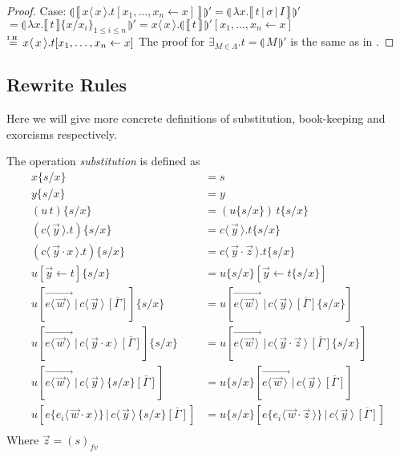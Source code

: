 \documentclass[a4paper,UKenglish,cleveref, autoref]{lipics-v2019}
\newcommand{\fv}[1]{(#1)_{fv}}
\newcommand{\abs}[2]{\lambda #1 . #2}
\newcommand{\app}[2]{#1 \, #2}
\newcommand{\fake}[3]{#1 \langle \, #2 \, \rangle . #3}
\newcommand{\share}[3]{#1 [#2 \leftarrow #3]}
\newcommand{\dist}[5]{#1 [ #2 \, \vert \, \fakedist{#4}{#5} \, #3 ]}
\newcommand{\fakedist}[2]{#1 \langle \, #2 \, \rangle}
\newcommand{\vecdist}[2]{\overrightarrow{\fakedist{#1}{#2} \,}}
\newcommand{\sub}[3]{#1 \{ #2 / #3 \}}
\newcommand{\compile}[1]{\llparenthesis \, #1 \, \rrparenthesis}
\newcommand{\readbackclose}[1]{\llbracket \, #1 \, \rrbracket }
\newcommand{\readbackwmap}[3]{\llbracket \, #1 \, \vert \, #2 \, \vert \, #3  \, \rrbracket }
\newcommand{\IH}{\stackrel{\hbox{\tiny I.H.}}{\hbox{=}}}
\begin{document}
\begin{proof}
\newline
\newline
\indent Case: $\compile{\readbackclose{\fake{x}{x}{t \share{}{x_{1}, \dots, x_{n}}{x}}}}' = \compile{\abs{x}{\readbackwmap{t}{\sigma}{I}}}'$
\newline
\indent $= \compile{\abs{x}{\readbackclose{t} \sub{}{x}{x_{i}}_{1 \leq i \leq n}}}' = \fake{x}{x}{ \compile{\readbackclose{t}}' \share{}{x_{1}, \dots, x_{n}}{x}}$
\newline
\indent $ \IH \fake{x}{x}{ t \share{}{x_{1}, \dots, x_{n}}{x}} $
\newline
\newline
The proof for $\exists_{ M \in \Lambda} . t = \compile{M}'$ is the same as in \cite{gundersen2013atomic}.
\end{proof}

\subsection{Rewrite Rules}

Here we will give more concrete definitions of substitution, book-keeping and exorcisms respectively. 

\begin{definition}[Substitution] The operation \emph{substitution} is defined as
\label{def:sub}
\begingroup
\allowdisplaybreaks
	\begin{align*}
		\sub{x}{s}{x}	&=	s \\
		\sub{y}{s}{x} 	&= 	y \\
		\sub{(\app{u}{t})}{s}{x} &= \app{(\sub{u}{s}{x})}{\sub{t}{s}{x}} \\
		\sub{(\fake{c}{\vec{y}}{t})}{s}{x} &= \fake{c}{\vec{y}}{\sub{t}{s}{x}} \\
		\sub{(\fake{c}{\vec{y} \cdot x}{t})}{s}{x} &= \fake{c}{\vec{y} \cdot \vec{z}}{\sub{t}{s}{x}} \\
		\sub{\share{u}{\vec{y}}{t}}{s}{x} &= \share{\sub{u}{s}{x}}{\vec{y}}{\sub{t}{s}{x}} \\
		\sub{\dist{u}{\vecdist{e}{\vec{w}}}{\overline{[\Gamma]}}{c}{\vec{y}}}{s}{x} &= \dist{u}{\vecdist{e}{\vec{w}}}{\overline{[\Gamma]} \sub{}{s}{x}}{c}{\vec{y}} \\
		\sub{\dist{u}{\vecdist{e}{\vec{w}}}{\overline{[\Gamma]}}{c}{\vec{y} \cdot x}}{s}{x} &= \dist{u}{\vecdist{e}{\vec{w}}}{\overline{[\Gamma]}\sub{}{s}{x}}{c}{\vec{y} \cdot \vec{z}} \\
		\dist{u}{\vecdist{e}{\vec{w}}}{\sub{}{s}{x}\overline{[\Gamma]}}{c}{\vec{y}} &= \dist{\sub{u}{s}{x}}{\vecdist{e}{\vec{w}}}{\overline{[\Gamma]}}{c}{\vec{y}} \\
		\dist{u}{e \{ \fakedist{e_{i}}{\vec{w} \cdot x }\}}{\sub{}{s}{x} \overline{[\Gamma]}}{c}{\vec{y}} &= \dist{\sub{u}{s}{x}}{e\{ \fakedist{e_{i}}{ \vec{w} \cdot \vec{z}} \}}{\overline{[\Gamma]}}{c}{\vec{y}} \\
	\end{align*}
\vspace{-1cm}
\newline
\noindent Where $\vec{z} = \fv{s}$
\endgroup
\end{definition}
\end{document}
